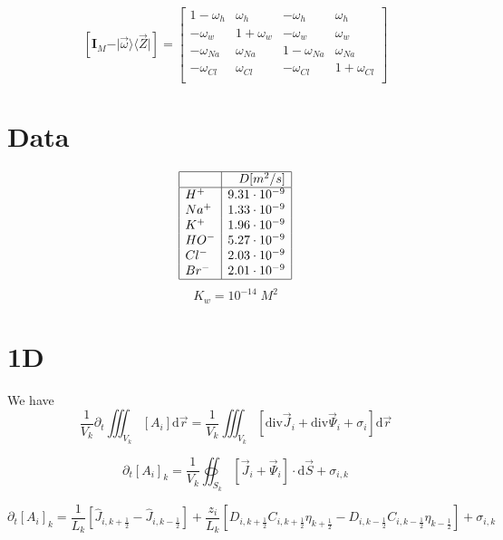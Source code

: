 \documentclass[aps,12pt]{revtex4}
\newcommand{\half}{\frac{1}{2}}
\begin{document}
\begin{equation}
\left[\bm I_M - \vert\vec \omega \rangle \langle \vec Z \vert \right] =
\begin{bmatrix}
1-\omega_h & \omega_h & -\omega_h & \omega_h\\
-\omega_w  & 1+\omega_w & -\omega_w & \omega_w\\
-\omega_{Na}  & \omega_{Na} & 1-\omega_{Na} & \omega_{Na}\\
-\omega_{Cl}  & \omega_{Cl} & -\omega_{Cl} & 1+\omega_{Cl}\\
\end{bmatrix}
\end{equation}

\section{Data}

\begin{equation}
\begin{array}{|l|r|}
\hline
 \text{} & D[m^2/s]  \\
 \hline
 	H^+	 & 9.31\cdot10^{-9}	\\
 	Na^+ & 1.33\cdot10^{-9}	 \\
 	K^+	 & 1.96\cdot10^{-9}	 \\
 	HO^- & 5.27\cdot10^{-9}	 \\
 	Cl^- & 2.03\cdot10^{-9} \\
 	Br^- & 2.01\cdot10^{-9} \\
\hline
\end{array}
\end{equation}
$$
	K_w = 10^{-14}\; M^2
$$

\section{1D}

We have 
\begin{equation}
	\dfrac{1}{V_k} \partial_t \iiint_{V_k} [A_i] \mathrm d\vec r = \dfrac{1}{V_k} \iiint_{V_k} \left[ \mathrm{div} \vec J_i + \mathrm{div} \vec \Psi _i + \sigma_i \right] \mathrm d \vec r
\end{equation}

\begin{equation}
	\partial_t [A_i]_k = \dfrac{1}{V_k}\oiint_{S_k}  \left[ \vec J_i + \vec \Psi_i \right] \cdot \mathrm d \vec S + \sigma_{i,k}
\end{equation}


\begin{equation}
	\partial_t  [A_i]_k = \dfrac{1}{L_k} \left[ \hat J_{i,k+\half} - \hat J_{i,k-\half} \right] 
	+ \dfrac{z_i}{L_k}\left[ D_{i,k+\half} C_{i,k+\half} \eta_{k+\half} -  D_{i,k-\half} C_{i,k-\half} \eta_{k-\half}\right]+ \sigma_{i,k}
\end{equation}
\end{document}
